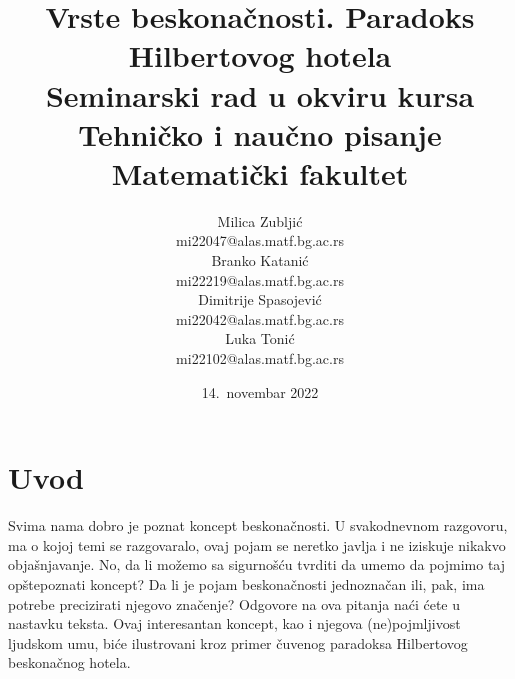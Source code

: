 \documentclass[a4paper]{article}
\begin{document}
\title{Vrste beskonačnosti. Paradoks Hilbertovog hotela\\ \small{Seminarski rad u okviru kursa\\Tehničko i naučno pisanje\\ Matematički fakultet}}

\author{Milica Zubljić\\ \small{mi22047@alas.matf.bg.ac.rs}\\ Branko Katanić\\ \small{mi22219@alas.matf.bg.ac.rs}\\ Dimitrije Spasojević\\ \small{mi22042@alas.matf.bg.ac.rs}\\ Luka Tonić\\ \small{mi22102@alas.matf.bg.ac.rs}}
\date{14.~novembar 2022}
\maketitle


\newpage

\tableofcontents %

\newpage

\section{Uvod}
\label{poglavlje:uvod}

Svima nama dobro je poznat koncept beskonačnosti. U svakodnevnom razgovoru, ma o kojoj temi se razgovaralo, ovaj pojam se neretko javlja i ne iziskuje nikakvo objašnjavanje. No, da li možemo sa sigurnošću tvrditi da umemo da pojmimo taj opštepoznati koncept? Da li je pojam beskonačnosti jednoznačan ili, pak, ima potrebe precizirati njegovo značenje? Odgovore na ova pitanja naći ćete u nastavku teksta. Ovaj interesantan koncept, kao i njegova (ne)pojmljivost ljudskom umu, biće ilustrovani
kroz primer čuvenog paradoksa Hilbertovog beskonačnog hotela.\\
\end{document}
